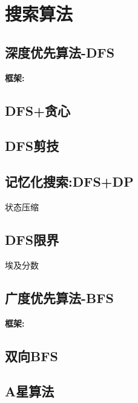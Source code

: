 \section{搜索算法}

\subsection{深度优先算法-DFS}

\textbf{框架:}

\subsection{DFS+贪心}
\subsection{DFS剪技}
\subsection{记忆化搜索:DFS+DP}
状态压缩
\subsection{DFS限界}
埃及分数
\subsection{广度优先算法-BFS}
\textbf{框架:}

\subsection{双向BFS}
\subsection{A星算法}